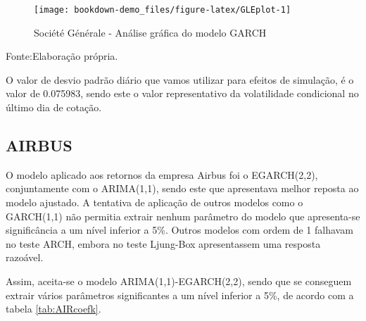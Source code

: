 \documentclass[
  12pt,
  a4paper,
  openany]{book}
\newenvironment{Shaded}{\begin{snugshade}}{\end{snugshade}}
\newcommand{\AttributeTok}[1]{\textcolor[rgb]{0.77,0.63,0.00}{#1}}
\newcommand{\CommentTok}[1]{\textcolor[rgb]{0.56,0.35,0.01}{\textit{#1}}}
\newcommand{\DecValTok}[1]{\textcolor[rgb]{0.00,0.00,0.81}{#1}}
\newcommand{\FunctionTok}[1]{\textcolor[rgb]{0.00,0.00,0.00}{#1}}
\newcommand{\NormalTok}[1]{#1}
\newcommand{\OtherTok}[1]{\textcolor[rgb]{0.56,0.35,0.01}{#1}}
\newcommand{\SpecialCharTok}[1]{\textcolor[rgb]{0.00,0.00,0.00}{#1}}
\newcommand{\StringTok}[1]{\textcolor[rgb]{0.31,0.60,0.02}{#1}}
\theoremstyle{definition}
\theoremstyle{definition}
\theoremstyle{definition}
\theoremstyle{remark}
\begin{document}
\begin{figure}

{\centering \texttt{[image: bookdown-demo\_files/figure-latex/GLEplot-1]} 

}

\caption{Société Générale - Análise gráfica do modelo GARCH}\label{fig:GLEplot}
\end{figure}
\FloatBarrier
\centering

Fonte:Elaboração própria.

\justifying
\bigskip

O valor de desvio padrão diário que vamos utilizar para efeitos de simulação, é o valor de 0.075983, sendo este o valor representativo da volatilidade condicional no último dia de cotação.

\hypertarget{airbus}{%
\subsection{AIRBUS}\label{airbus}}

O modelo aplicado aos retornos da empresa Airbus foi o EGARCH(2,2), conjuntamente com o ARIMA(1,1), sendo este que apresentava melhor reposta ao modelo ajustado. A tentativa de aplicação de outros modelos como o GARCH(1,1) não permitia extrair nenhum parâmetro do modelo que apresenta-se significância a um nível inferior a 5\%. Outros modelos com ordem de 1 falhavam no teste ARCH, embora no teste Ljung-Box apresentassem uma resposta razoável.

Assim, aceita-se o modelo ARIMA(1,1)-EGARCH(2,2), sendo que se conseguem extrair vários parâmetros significantes a um nível inferior a 5\%, de acordo com a tabela \ref{tab:AIRcoefk}.

\scriptsize

\begin{Shaded}
\end{Shaded}
\end{document}
